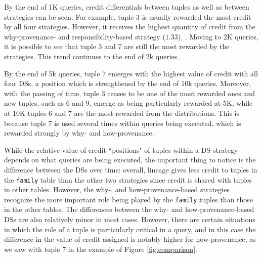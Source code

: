 
By the end of 1K queries, credit differentials between tuples as well as between strategies can be seen.  For example, tuple 3 is usually rewarded the most credit by all four strategies. However, it receives the highest quantity of credit from the why-provenance- and responsibility-based strategy ($1.33$).
.
Moving to 2K queries, it is possible to see that tuple 3 and 7 are still the most rewarded by the strategies.
This trend continues to the end of 2k queries.

By the end of 5k queries, tuple 7 emerges with the highest value of credit with all four DSs, a position which is strengthened by the end of 10k queries. Moreover, with the passing of time, tuple 3 ceases to be one of the most rewarded ones and new tuples, such as 6 and 9, emerge as being particularly rewarded at 5K, while at 10K tuples 6 and 7 are the most rewarded from the distributions.
This is because tuple 7 is used several times within queries being executed, which is rewarded strongly by why- and how-provenance.


While the relative value of credit ``positions" of tuples within a DS strategy depends on what queries are being executed, the important thing to notice is the difference between the DSs over time:  overall, lineage gives less credit to tuples in the \texttt{family} table than the other two strategies since credit is  shared with tuples in other tables.
However, the why-,  and how-provenance-based strategies recognize the more important role being played by the \texttt{family} tuples than those in the other tables.
The differences between the why- and how-provenance-based DSs are also relatively minor in most cases. However, there are certain situations in which the role of a tuple is particularly critical in a query, and in this case the difference in the value of credit assigned is notably higher for how-provenance, as we saw with tuple 7 in the example of Figure \ref{fig:comparison}. 


